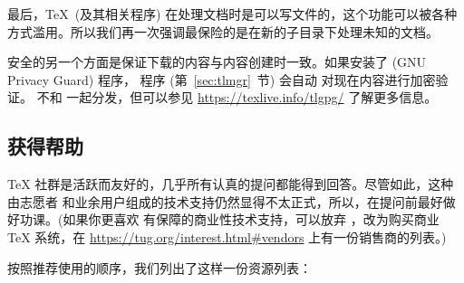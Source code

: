 \documentclass{article}
\begin{document}
最后，\TeX\ (及其相关程序) 在处理文档时是可以写文件的，这个功能可以被各种
方式滥用。所以我们再一次强调最保险的是在新的子目录下处理未知的文档。

安全的另一个方面是保证下载的内容与内容创建时一致。如果安装了 
(GNU Privacy Guard) 程序， 程序 (第~\ref{sec:tlmgr}~节) 会自动
对现在内容进行加密验证。 不和 \TL{} 一起分发，但可以参见
\url{https://texlive.info/tlgpg/} 了解更多信息。

\subsection{获得帮助}
\label{sec:help}

\TeX{} 社群是活跃而友好的，几乎所有认真的提问都能得到回答。尽管如此，这种由志愿者
和业余用户组成的技术支持仍然显得不太正式，所以，在提问前最好做好功课。(如果你更喜欢
有保障的商业性技术支持，可以放弃 \TL{}，改为购买商业 \TeX{} 系统，在
\url{https://tug.org/interest.html#vendors} 上有一份销售商的列表。)

按照推荐使用的顺序，我们列出了这样一份资源列表：
\end{document}
